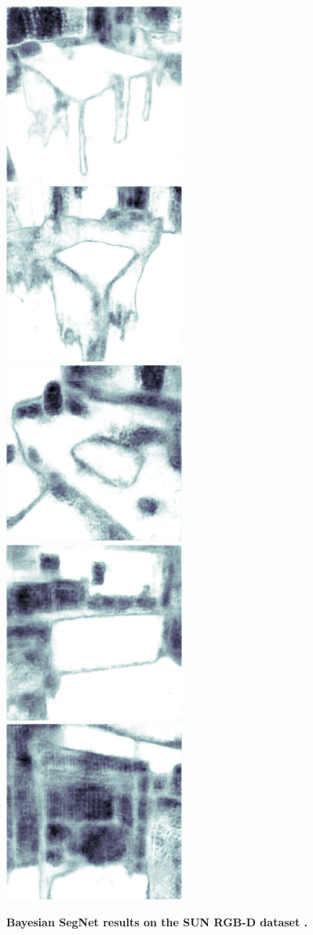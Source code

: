 \begin{figure}[p]
\begin{center}
{\includegraphics[height=0.125\linewidth]{BayesianSegNet/segnet_bayes_00375_uncertainty.png}
\includegraphics[height=0.125\linewidth]{BayesianSegNet/segnet_bayes_00461_uncertainty.png}
\includegraphics[height=0.125\linewidth]{BayesianSegNet/segnet_bayes_00116_uncertainty.png}
\includegraphics[height=0.125\linewidth]{BayesianSegNet/segnet_bayes_01035_uncertainty.png}
\includegraphics[height=0.125\linewidth]{BayesianSegNet/segnet_bayes_00856_uncertainty.png}
}
\end{center}
\caption[Bayesian SegNet results on the SUN RGB-D dataset.]{\footnotesize \textbf{Bayesian SegNet results on the SUN RGB-D dataset \citep{song2015sun}.}}
\label{fig:qual_sun}


\end{figure}
